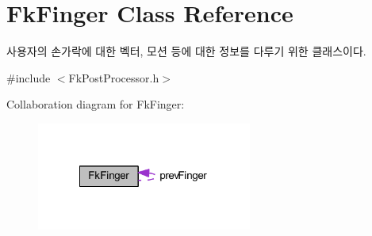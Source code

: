 \hypertarget{class_fk_finger}{}\section{Fk\+Finger Class Reference}
\label{class_fk_finger}


사용자의 손가락에 대한 벡터, 모션 등에 대한 정보를 다루기 위한 클래스이다.  




{\ttfamily \#include $<$Fk\+Post\+Processor.\+h$>$}



Collaboration diagram for Fk\+Finger\+:\nopagebreak
\begin{figure}[H]
\begin{center}
\leavevmode
\includegraphics[width=200pt]{class_fk_finger__coll__graph}
\end{center}
\end{figure}
